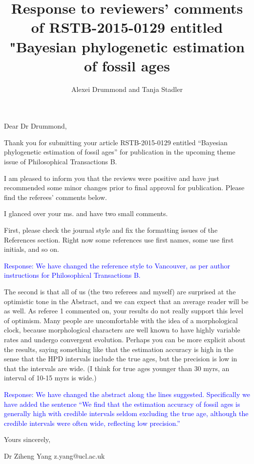\documentclass[11pt]{article}
\newcommand{\response}[1]{\medskip{}\textcolor{blue}{{Response: #1}}\medskip{}}
\begin{document}
\title{Response to reviewers' comments of RSTB-2015-0129 entitled "Bayesian phylogenetic estimation of fossil ages}
\author{Alexei Drummond and Tanja Stadler}
\date{}
\maketitle

Dear Dr Drummond,

Thank you for submitting your article RSTB-2015-0129 entitled ``Bayesian phylogenetic estimation of fossil ages'' for publication in the upcoming theme issue of Philosophical Transactions B.

I am pleased to inform you that the reviews were positive and have just recommended some minor changes prior to final approval for publication. Please find the referees' comments below.

I glanced over your ms. and have two small comments.

First, please check the journal style and fix the formatting issues of the References section.  Right now some references use first names, some use first initials, and so on.  

\response{We have changed the reference style to Vancouver, as per author instructions for Philosophical Transactions B.}

The second is that all of us (the two referees and myself) are surprised at the optimistic tone in the Abstract, and we can expect that an average reader will be as well.  As referee 1 commented on, your results do not really support this level of optimism.  Many people are uncomfortable with the idea of a morphological clock, because morphological characters are well known to have highly variable rates and undergo convergent evolution.  Perhaps you can be more explicit about the results, saying something like that the estimation accuracy is high in the sense that the HPD intervals include the true ages, but the precision is low in that the intervals are wide.  (I think for true ages younger than 30 myrs, an interval of 10-15 myrs is wide.)

\response{We have changed the abstract along the lines suggested. Specifically we have added the sentence ``We find that the estimation accuracy of fossil ages is generally high with credible intervals seldom excluding the true age, although the credible intervals were often wide, reflecting low precision.''}

Yours sincerely,

Dr Ziheng Yang
z.yang@ucl.ac.uk
\end{document}
